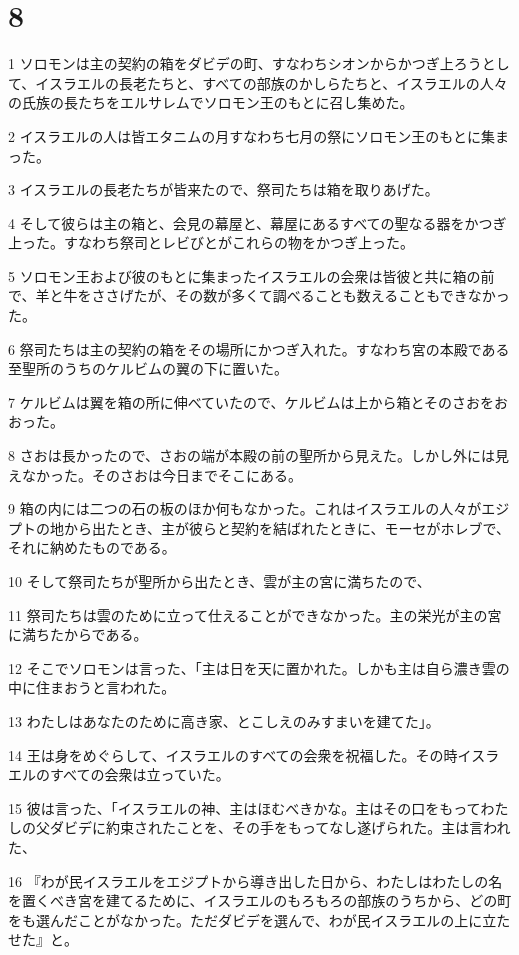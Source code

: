 \chapter{8}

\par 1 ソロモンは主の契約の箱をダビデの町、すなわちシオンからかつぎ上ろうとして、イスラエルの長老たちと、すべての部族のかしらたちと、イスラエルの人々の氏族の長たちをエルサレムでソロモン王のもとに召し集めた。
\par 2 イスラエルの人は皆エタニムの月すなわち七月の祭にソロモン王のもとに集まった。
\par 3 イスラエルの長老たちが皆来たので、祭司たちは箱を取りあげた。
\par 4 そして彼らは主の箱と、会見の幕屋と、幕屋にあるすべての聖なる器をかつぎ上った。すなわち祭司とレビびとがこれらの物をかつぎ上った。
\par 5 ソロモン王および彼のもとに集まったイスラエルの会衆は皆彼と共に箱の前で、羊と牛をささげたが、その数が多くて調べることも数えることもできなかった。
\par 6 祭司たちは主の契約の箱をその場所にかつぎ入れた。すなわち宮の本殿である至聖所のうちのケルビムの翼の下に置いた。
\par 7 ケルビムは翼を箱の所に伸べていたので、ケルビムは上から箱とそのさおをおおった。
\par 8 さおは長かったので、さおの端が本殿の前の聖所から見えた。しかし外には見えなかった。そのさおは今日までそこにある。
\par 9 箱の内には二つの石の板のほか何もなかった。これはイスラエルの人々がエジプトの地から出たとき、主が彼らと契約を結ばれたときに、モーセがホレブで、それに納めたものである。
\par 10 そして祭司たちが聖所から出たとき、雲が主の宮に満ちたので、
\par 11 祭司たちは雲のために立って仕えることができなかった。主の栄光が主の宮に満ちたからである。
\par 12 そこでソロモンは言った、「主は日を天に置かれた。しかも主は自ら濃き雲の中に住まおうと言われた。
\par 13 わたしはあなたのために高き家、とこしえのみすまいを建てた」。
\par 14 王は身をめぐらして、イスラエルのすべての会衆を祝福した。その時イスラエルのすべての会衆は立っていた。
\par 15 彼は言った、「イスラエルの神、主はほむべきかな。主はその口をもってわたしの父ダビデに約束されたことを、その手をもってなし遂げられた。主は言われた、
\par 16 『わが民イスラエルをエジプトから導き出した日から、わたしはわたしの名を置くべき宮を建てるために、イスラエルのもろもろの部族のうちから、どの町をも選んだことがなかった。ただダビデを選んで、わが民イスラエルの上に立たせた』と。
